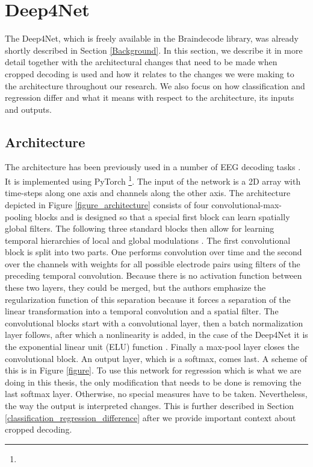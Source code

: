 \section{Deep4Net}\label{sec:deep4net}
The Deep4Net, which is freely available in the Braindecode library, was already shortly described in Section \ref{Background}. 
In this section, we describe it in more detail together with the architectural changes that need to be made when cropped decoding is used and how it relates to the changes we were making to the architecture throughout our research. 
We also focus on how classification and regression differ and what it means with respect to the architecture, its inputs and outputs. 

\subsection{Architecture}\label{subsec:architecture}
The architecture has been previously used in a number of EEG decoding tasks \cite{}.
It is implemented using PyTorch \footnote{}.
The input of the network is a 2D array with time-steps along one axis and channels along the other axis.
The architecture depicted in Figure \ref{figure_architecture} consists of four convolutional-max-pooling blocks and is designed so that a special first block can learn spatially global filters.
The following three standard blocks then allow for learning temporal hierarchies of local and global modulations \cite{Schirrmeister_2017}.
The first convolutional block is split into two parts.
One performs convolution over time and the second over the channels with weights for all possible electrode pairs using filters of the preceding temporal convolution.
Because there is no activation function between these two layers, they could be merged, but the authors emphasize the regularization function of this separation because it forces a separation of the linear transformation into a temporal convolution and a spatial filter.
The convolutional blocks start with a convolutional layer, then a batch normalization layer follows, after which a nonlinearity is added, in the case of the Deep4Net it is the exponential linear unit (ELU) function \cite{}.
Finally a max-pool layer closes the convolutional block.
An output layer, which is a softmax, comes last.
A scheme of this is in Figure \ref{figure}.
To use this network for regression which is what we are doing in this thesis, the only modification that needs to be done is removing the last softmax layer.
Otherwise, no special measures have to be taken.
Nevertheless, the way the output is interpreted changes.
This is further described in Section \ref{classification_regression_difference} after we provide important context about cropped decoding.

